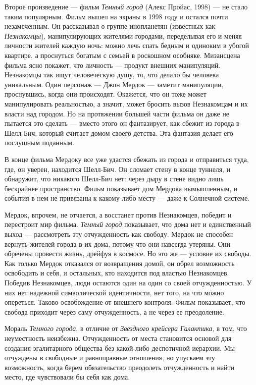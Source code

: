\documentclass[12pt]{book}
\begin{document}
Второе произведение --- фильм \textit{Темный город} (Алекс Пройас, 1998) --- не стало таким популярным. Фильм вышел на экраны в 1998 году и остался почти незамеченным. Он рассказывал о группе инопланетян (известных как \textit{Незнакомцы}), манипулирующих жителями городами, переделывая его и меняя личности жителей каждую ночь: можно лечь спать бедным и одиноким в убогой квартире, а проснуться богатым с семьей в роскошном особняке. Мизансцена фильма ясно покажет, что личность --- продукт внешних манипуляций. Незнакомцы так ищут человеческую душу, то, что делало бы человека уникальным. Один персонаж --- Джон Мердок --- заметит манипуляции, проснувшись, когда они происходят. Окажется, что он тоже может манипулировать реальностью, а значит, может бросить вызов Незнакомцам и их власти над городом. Но на протяжении большей части фильма он даже не пытается это сделать --- вместо этого он фантазирует, как сбежит из города в Шелл-Бич, который считает домом своего детства. Эта фантазия делает его послушным поданным.

В конце фильма Мердоку все уже удастся сбежать из города и отправиться туда, где, он уверен, находится Шелл-Бич. Он сломает стену в конце туннеля, и обнаружит, что никакого Шелл-Бич нет: через дыру в стене видно лишь бескрайнее пространство. Фильм показывает дом Мердока вымышленным, и события в нем не привязаны к какому-либо месту --- даже к Солнечной системе.

Мердок, впрочем, не отчается, а восстанет против Незнакомцев, победит и перестроит мир фильма. \textit{Темный город} показывает, что дома нет и единственный выход --- рассмотреть эту отчужденность как свободу. Мердок не способен вернуть жителей города в их дома, потому что они навсегда утеряны. Они обречены провести жизнь, дрейфуя в космосе. Но это же --- условие их свободы. Как только Мердок отказался от возвращения домой, он обрел возможность освободить и себя, и остальных, кто находится под властью Незнакомцев. Победив Незнакомцев, люди остаются один на один со своей отчужденностью. У них нет надежной символической идентичности, нет того, на что можно опереться. Таково освобождение от внешнего контроля. Фильм показывает, что свобода приходит через саму отчужденность, а не через ее преодоление.

Мораль \textit{Темного города}, в отличие от \textit{Звездного крейсера Галактика}, в том, что неуместность неизбежна. Отчужденность от места становится основой для создания эгалитарного общества без какой-либо деспотичной иерархии. Мы отчуждены в свободные и равноправные отношения, но упускаем эту возможность, когда берем обязательство преодолеть отчужденность и найти место, где чувствовали бы себя как дома.
\end{document}

